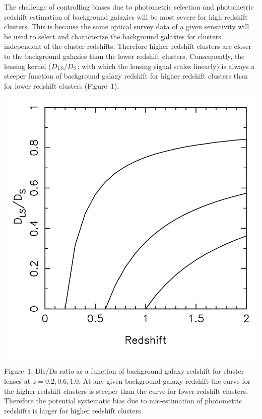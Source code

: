 \documentclass[a4paper,11pt]{article}
\begin{document}
The challenge of controlling biases due to photometric selection and
photometric redshift estimation of background galaxies will be most
severe for high redshift clusters.  This is because the same optical
survey data of a given sensitivity will be used to select and
characterize the background galaxies for clusters independent of the
cluster redshifts.  Therefore higher redshift clusters are closer to
the background galaxies than the lower redshift clusters.
Consequently, the lensing kernel ($D_{\rm LS}/D_{\rm S}$; with which
the lensing signal scales linearly) is always a steeper function of
background galaxy redshift for higher redshift clusters than for lower
redshift clusters (Figure~1).

\noindent
\begin{minipage}{60mm}
    \includegraphics[width=\hsize]{dlsds.png}
\end{minipage}
\hspace{5mm}
\begin{minipage}{105mm}
  Figure~1: Dls/Ds ratio as a function of background galaxy redshift
  for cluster lenses at $z=0.2,0.6,1.0$. At any given background
  galaxy redshift the curve for the higher redshift clusters is
  steeper than the curve for lower redshift clusters.  Therefore the
  potential systematic bias due to mis-estimation of photometric
  redshifts is larger for higher redshift clusters.
\end{minipage}
\end{document}
